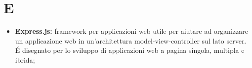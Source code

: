\section*{E} %
\label{sec:e}
	\begin{itemize}
		\item \textbf{Express.js:} framework per applicazioni web utile per aiutare ad organizzare un applicazione web in un'architettura model-view-controller sul lato server. É disegnato per lo sviluppo di applicazioni web a pagina singola, multipla e ibrida;
	\end{itemize}
\pagebreak
